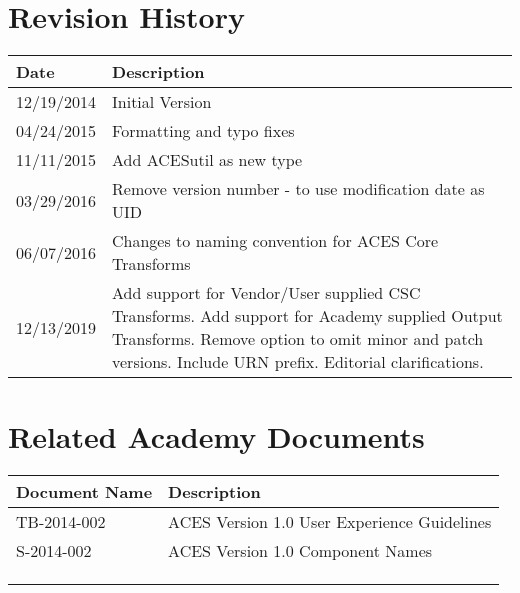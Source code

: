 \prelimsectionformat	%
\chapter{Revision History}

\begin{tabularx}{\linewidth}{|l|X|}
    \hline
    Date & Description \\ \hline
    12/19/2014 & Initial Version      \\ \hline
    04/24/2015 & Formatting and typo fixes \\ \hline
    11/11/2015 & Add ACESutil as new type  \\ \hline
    03/29/2016 & Remove version number - to use modification date as UID \\ \hline
    06/07/2016 & Changes to naming convention for ACES Core Transforms \\ \hline
    12/13/2019 & Add support for Vendor/User supplied CSC Transforms.  Add support for Academy supplied Output Transforms.  Remove option to omit minor and patch versions.  Include URN prefix.  Editorial clarifications. \\ \hline
\end{tabularx}

\vspace{0.25in} %
\chapter{Related Academy Documents} %
\begin{tabularx}{\linewidth}{|l|X|}
    \hline
    Document Name & Description \\ \hline
    TB-2014-002  & ACES Version 1.0 User Experience Guidelines \\ \hline
    S-2014-002  & ACES Version 1.0 Component Names \\ \hline
    & \\ \hline
    & \\ \hline
    & \\ \hline
\end{tabularx}